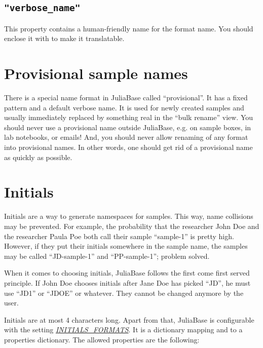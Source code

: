 \documentclass[a4paper,11pt,english]{sphinxmanual}
\begin{document}
\subsection{\texttt{"verbose\_name"}}
\label{programming/sample_names:verbose-name}
This property contains a human-friendly name for the format name.  You should
enclose it with  to make it translatable.


\section{Provisional sample names}
\label{programming/sample_names:provisional-sample-names}\label{programming/sample_names:index-2}
There is a special name format in JuliaBase called “provisional”.  It has a
fixed pattern  and a default verbose name.  It is used for newly
created samples and usually immediately replaced by something real in the “bulk
rename” view.  You should never use a provisional name outside JuliaBase,
e.g. on sample boxes, in lab notebooks, or emails!  And, you should never allow
renaming of any format into provisional names.  In other words, one should get
rid of a provisional name as quickly as possible.


\section{Initials}
\label{programming/sample_names:index-3}\label{programming/sample_names:id1}\label{programming/sample_names:initials}
Initials are a way to generate namespaces for samples.  This way, name
collisions may be prevented.  For example, the probability that the researcher
John Doe and the researcher Paula Poe both call their sample “sample-1” is
pretty high.  However, if they put their initials somewhere in the sample name,
the samples may be called “JD-sample-1” and “PP-sample-1”; problem solved.

When it comes to choosing initials, JuliaBase follows the first come first
served principle.  If John Doe chooses initials after Jane Doe has picked “JD”,
he must use “JD1” or “JDOE” or whatever.  They cannot be changed anymore by the
user.

Initials are at most 4 characters long.  Apart from that, JuliaBase is
configurable with the setting {\hyperref[programming/settings:initials-formats]{\emph{INITIALS\_FORMATS}}}.  It is a dictionary
mapping  and  to a properties dictionary.  The
allowed properties are the following:
\end{document}
